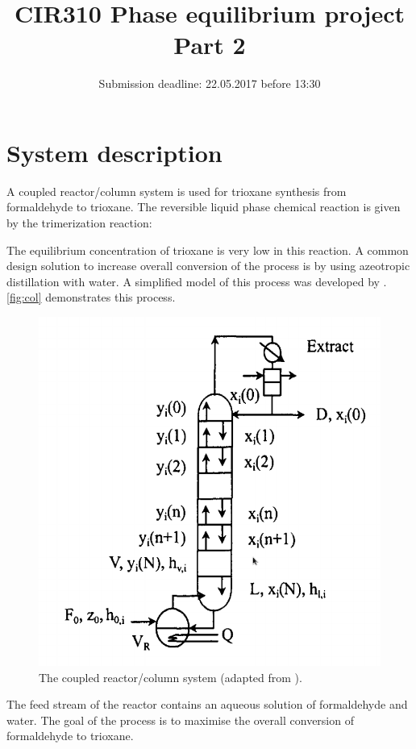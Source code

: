 \documentclass[12pt, A4paper]{article}
\title{CIR310 Phase equilibrium project\\Part 2}
\date{Submission deadline: 22.05.2017 before 13:30}
\begin{document}
\maketitle
\section{System description}
A coupled reactor/column system is used for trioxane synthesis from formaldehyde to trioxane.  The reversible liquid phase chemical reaction is given by the trimerization reaction:
 
{\centering
{} \par
}
The equilibrium concentration of trioxane is very low in this reaction. A common design solution to increase overall conversion of the process is by using azeotropic distillation with water. A simplified model of this process was developed by \citet{HU19991353}. \autoref{fig:col} demonstrates this process.

 \begin{figure} \centering
 \includegraphics[scale=0.45]{img/reaccol.png}
 \caption{ The coupled reactor/column system (adapted from \citet{HU19991353}).} \label{fig:col}
\end{figure}
 
The feed stream of the reactor contains an aqueous solution of formaldehyde and water.
The goal of the process is to maximise the overall conversion of formaldehyde to trioxane.
\end{document}

